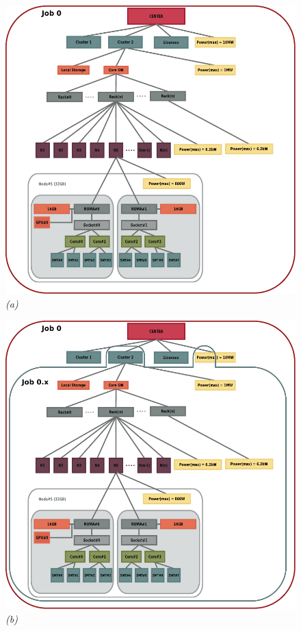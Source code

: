 \documentclass[10pt]{article}
\begin{document}
\begin{figure}
\begin{minipage}{0.5\linewidth}
  \begin{center}
  \includegraphics[scale=0.45]{../fig/job-hierarchy-job0}
  {\em (a)}
  \end{center}
\end{minipage}
\begin{minipage}{0.5\linewidth}
  \begin{center}
  \includegraphics[scale=0.45]{../fig/job-hierarchy-job0-x}
  {\em (b)}
  \end{center}
\end{minipage}


\end{figure}
\end{document}
